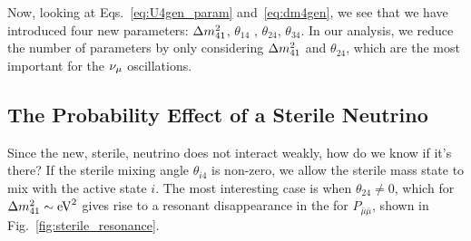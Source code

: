 Now, looking at Eqs.~\ref{eq:U4gen_param} and~\ref{eq:dm4gen}, we see that we have introduced four new parameters: $\dm[41]$, $\theta_{14}$
, $\theta_{24}$, $\theta_{34}$. In our analysis, we reduce the number of parameters by only considering $\dm[41]$ and $\theta_{24}$, which are 
the most important for the $\nu_\mu$ oscillations. 

\subsection{The Probability Effect of a Sterile Neutrino}
Since the new, sterile, neutrino does not interact weakly, how do we know if it's there? If the sterile mixing angle $\theta_{i4}$ is non-zero, 
we allow the sterile mass state to mix with the active state $i$. The most interesting case is when $\theta_{24} \neq 0$, 
which for $\dm[41] \sim \si{\eV \squared}$ gives rise to a resonant disappearance in the for $P_{\bar{\mu}\bar{\mu}}$, shown in Fig.~\ref{fig:sterile_resonance}.

